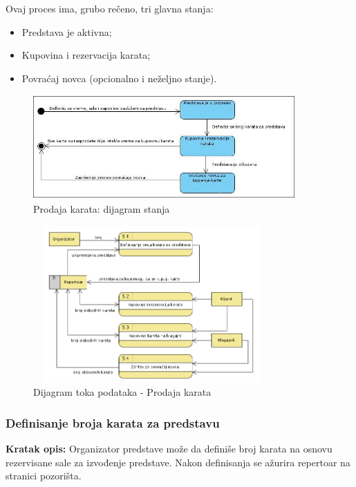 \documentclass[a4paper]{article}
\begin{document}
Ovaj proces ima, grubo rečeno, tri glavna stanja:
\begin{itemize}
  \item Predstava je aktivna;
  \item Kupovina i rezervacija karata;
  \item Povraćaj novca (opcionalno i neželjno stanje).
\end{itemize}

\begin{figure}[H]
  \begin{center}
      \includegraphics[width=100mm,height=40mm]{../images/state_prodaja_karata.jpg}
  \end{center}
  \caption{Prodaja karata: dijagram stanja}
  \label{state_prodaja_karata}
\end{figure}

\begin{figure}[H]
  \begin{center}
      \includegraphics[width=90mm,height=60mm]{../images/dfd2_prodaja_karata.png}
  \end{center}
  \caption{Dijagram toka podataka - Prodaja karata}
  \label{dfd2_prodaja_karata}
\end{figure}

\subsubsection{Definisanje broja karata za predstavu}
\noindent\textbf{Kratak opis:} Organizator predstave može da definiše broj karata na osnovu rezervisane
sale za izvođenje predstave. Nakon definisanja se ažurira repertoar na stranici pozorišta.\\
\end{document}
